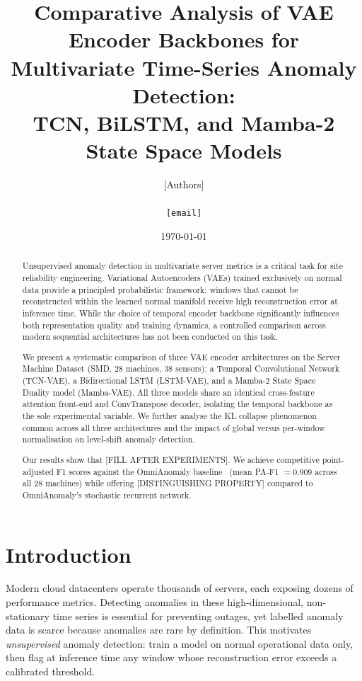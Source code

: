 \documentclass[10pt,twocolumn]{article}
\title{%
  \textbf{Comparative Analysis of VAE Encoder Backbones for\\
  Multivariate Time-Series Anomaly Detection:\\
  TCN, BiLSTM, and Mamba-2 State Space Models}
}
\author{%
  [Authors]\\
  [Institution]\\
  \texttt{[email]}
}
\date{\today}
\begin{document}
\maketitle

\begin{abstract}
Unsupervised anomaly detection in multivariate server metrics is a critical
task for site reliability engineering. Variational Autoencoders (VAEs) trained
exclusively on normal data provide a principled probabilistic framework: windows
that cannot be reconstructed within the learned normal manifold receive high
reconstruction error at inference time.  While the choice of temporal encoder
backbone significantly influences both representation quality and training
dynamics, a controlled comparison across modern sequential architectures has
not been conducted on this task.

We present a systematic comparison of three VAE encoder architectures on the
Server Machine Dataset (SMD, 28 machines, 38 sensors): a Temporal Convolutional
Network (TCN-VAE), a Bidirectional LSTM (LSTM-VAE), and a Mamba-2
State Space Duality model (Mamba-VAE). All three models share an identical
cross-feature attention front-end and ConvTranspose decoder, isolating the
temporal backbone as the sole experimental variable. We further analyse the KL
collapse phenomenon common across all three architectures and the impact of
global versus per-window normalisation on level-shift anomaly detection.

Our results show that [FILL AFTER EXPERIMENTS]. We achieve competitive
point-adjusted F1 scores against the OmniAnomaly baseline~\cite{su2019robust}
(mean PA-F1 $= 0.909$ across all 28 machines) while offering
[DISTINGUISHING PROPERTY] compared to OmniAnomaly's stochastic recurrent network.
\end{abstract}


\section{Introduction}

Modern cloud datacenters operate thousands of servers, each exposing dozens of
performance metrics. Detecting anomalies in these high-dimensional,
non-stationary time series is essential for preventing outages, yet labelled
anomaly data is scarce because anomalies are rare by definition. This motivates
\emph{unsupervised} anomaly detection: train a model on normal operational data
only, then flag at inference time any window whose reconstruction error exceeds
a calibrated threshold.
\end{document}
